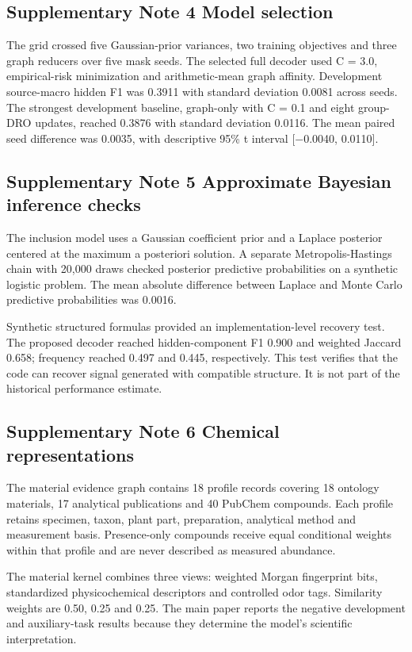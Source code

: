 \documentclass[11pt]{article}
\begin{document}
\subsection{Supplementary Note 4 Model selection}

The grid crossed five Gaussian-prior variances, two training objectives and three graph reducers over five mask seeds. The selected full decoder used C = 3.0, empirical-risk minimization and arithmetic-mean graph affinity. Development source-macro hidden F1 was 0.3911 with standard deviation 0.0081 across seeds. The strongest development baseline, graph-only with C = 0.1 and eight group-DRO updates, reached 0.3876 with standard deviation 0.0116. The mean paired seed difference was 0.0035, with descriptive 95\% t interval [\ensuremath{-}0.0040, 0.0110].

\subsection{Supplementary Note 5 Approximate Bayesian inference checks}

The inclusion model uses a Gaussian coefficient prior and a Laplace posterior centered at the maximum a posteriori solution. A separate Metropolis-Hastings chain with 20,000 draws checked posterior predictive probabilities on a synthetic logistic problem. The mean absolute difference between Laplace and Monte Carlo predictive probabilities was 0.0016.

Synthetic structured formulas provided an implementation-level recovery test. The proposed decoder reached hidden-component F1 0.900 and weighted Jaccard 0.658; frequency reached 0.497 and 0.445, respectively. This test verifies that the code can recover signal generated with compatible structure. It is not part of the historical performance estimate.

\subsection{Supplementary Note 6 Chemical representations}

The material evidence graph contains 18 profile records covering 18 ontology materials, 17 analytical publications and 40 PubChem compounds. Each profile retains specimen, taxon, plant part, preparation, analytical method and measurement basis. Presence-only compounds receive equal conditional weights within that profile and are never described as measured abundance.

The material kernel combines three views: weighted Morgan fingerprint bits, standardized physicochemical descriptors and controlled odor tags. Similarity weights are 0.50, 0.25 and 0.25. The main paper reports the negative development and auxiliary-task results because they determine the model's scientific interpretation.
\end{document}
